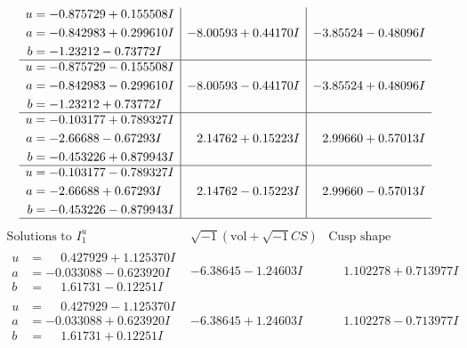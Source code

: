 \documentclass[1p]{elsarticle_modified}
\theoremstyle{definition}
\newcommand{\I}{\sqrt{-1}}
\begin{document}
$$\begin{array}{c|c|c}
\begin{aligned}
u &= -0.875729 + 0.155508 I \\
a &= -0.842983 + 0.299610 I \\
b &= -1.23212 - 0.73772 I\end{aligned}
 & -8.00593 + 0.44170 I & -3.85524 - 0.48096 I \\ \hline\begin{aligned}
u &= -0.875729 - 0.155508 I \\
a &= -0.842983 - 0.299610 I \\
b &= -1.23212 + 0.73772 I\end{aligned}
 & -8.00593 - 0.44170 I & -3.85524 + 0.48096 I \\ \hline\begin{aligned}
u &= -0.103177 + 0.789327 I \\
a &= -2.66688 - 0.67293 I \\
b &= -0.453226 + 0.879943 I\end{aligned}
 & \phantom{-}2.14762 + 0.15223 I & \phantom{-}2.99660 + 0.57013 I \\ \hline\begin{aligned}
u &= -0.103177 - 0.789327 I \\
a &= -2.66688 + 0.67293 I \\
b &= -0.453226 - 0.879943 I\end{aligned}
 & \phantom{-}2.14762 - 0.15223 I & \phantom{-}2.99660 - 0.57013 I\\
 \hline 
 \end{array}$$\newpage$$\begin{array}{c|c|c}  
\text{Solutions to }I^u_{1}& \I (\text{vol} + \sqrt{-1}CS) & \text{Cusp shape}\\
 \hline 
\begin{aligned}
u &= \phantom{-}0.427929 + 1.125370 I \\
a &= -0.033088 - 0.623920 I \\
b &= \phantom{-}1.61731 - 0.12251 I\end{aligned}
 & -6.38645 - 1.24603 I & \phantom{-}1.102278 + 0.713977 I \\ \hline\begin{aligned}
u &= \phantom{-}0.427929 - 1.125370 I \\
a &= -0.033088 + 0.623920 I \\
b &= \phantom{-}1.61731 + 0.12251 I\end{aligned}
 & -6.38645 + 1.24603 I & \phantom{-}1.102278 - 0.713977 I \\ \hline\begin{aligned}

\end{aligned}
\end{array}$$
\end{document}

